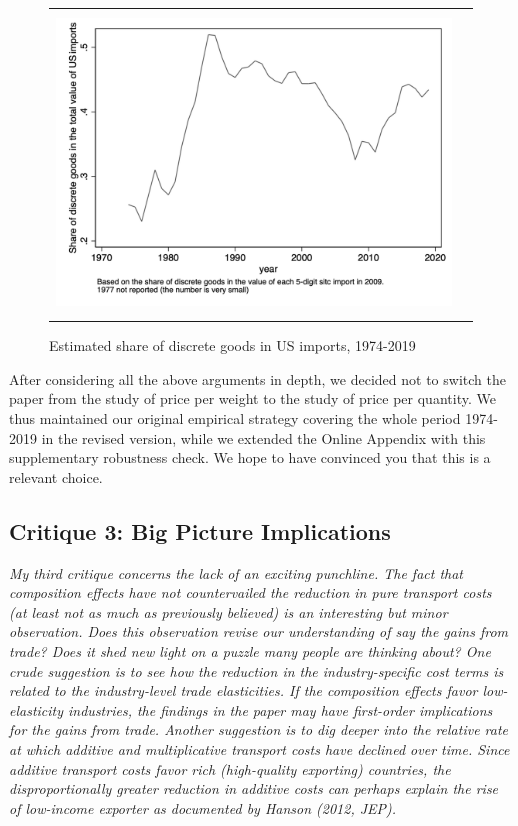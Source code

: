 \documentclass[a4paper,11pt]{article}
\begin{document}
\begin{figure}[htbp]
	\caption{Estimated share of discrete goods in US imports, 1974-2019}
	\begin{center}
		\begin{tabular}{cc}
			\includegraphics[height=8cm]{../../revised_article/Share_of_discrete_goods.png}\\
		\end{tabular}
	\end{center}
	\label{graph_Share_of_discrete_goods.png}%
\end{figure}


After considering all the above arguments in depth, we decided not to switch the paper from the study of price per weight to the study of price per quantity. We thus maintained our original empirical strategy covering the whole period 1974-2019 in the revised version, while we extended the Online Appendix with this supplementary robustness check. We hope to have convinced you that this is a relevant choice.

\subsection{Critique 3: Big Picture Implications}

\textit{My third critique concerns the lack of an exciting punchline. The fact that
composition effects have not countervailed the reduction in pure transport costs
(at least not as much as previously believed) is an interesting but minor observation.
Does this observation revise our understanding of say the gains from
trade? Does it shed new light on a puzzle many people are thinking about?
One crude suggestion is to see how the reduction in the industry-specific cost
terms is related to the industry-level trade elasticities. If the composition effects
favor low-elasticity industries, the findings in the paper may have first-order
implications for the gains from trade.
Another suggestion is to dig deeper into the relative rate at which additive
and multiplicative transport costs have declined over time. Since additive transport
costs favor rich (high-quality exporting) countries, the disproportionally
greater reduction in additive costs can perhaps explain the rise of low-income
exporter as documented by Hanson (2012, JEP).}
\end{document}
